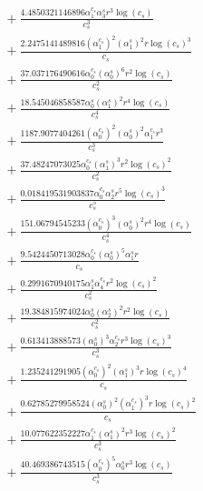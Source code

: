 \documentclass[10pt]{article}
\begin{document}
\begin{align*}
&{}  + \frac{4.4850321146896 \alpha_{1}^{c_s} \alpha_{3}^s r^{3} \log{\left(c_{s} \right)}}{c_{s}^{3}} \\
&{}  + \frac{2.2475141489816 \left(\alpha_{1}^{c_s}\right)^{2} \left(\alpha_{1}^s\right)^{2} r \log{\left(c_{s} \right)}^{3}}{c_{s}} \\
&{}  + \frac{37.037176490616 \alpha_{0}^{c_s} \left(\alpha_{0}^s\right)^{6} r^{2} \log{\left(c_{s} \right)}}{c_{s}^{2}} \\
&{}  + \frac{18.545046858587 \alpha_{0}^s \left(\alpha_{1}^s\right)^{2} r^{4} \log{\left(c_{s} \right)}}{c_{s}^{4}} \\
&{}  + \frac{1187.9077404261 \left(\alpha_{0}^{c_s}\right)^{2} \left(\alpha_{0}^s\right)^{2} \alpha_{1}^{c_s} r^{3}}{c_{s}^{3}} \\
&{}  + \frac{37.48247073025 \alpha_{0}^{c_s} \left(\alpha_{1}^s\right)^{3} r^{2} \log{\left(c_{s} \right)}^{2}}{c_{s}^{2}} \\
&{}  + \frac{0.018419531903837 \alpha_{0}^{c_s} \alpha_{2}^s r^{5} \log{\left(c_{s} \right)}^{3}}{c_{s}^{5}} \\
&{}  + \frac{151.06794545233 \left(\alpha_{0}^{c_s}\right)^{3} \left(\alpha_{0}^s\right)^{2} r^{4} \log{\left(c_{s} \right)}}{c_{s}^{4}} \\
&{}  + \frac{9.5424450713028 \alpha_{0}^{c_s} \left(\alpha_{0}^s\right)^{5} \alpha_{1}^s r}{c_{s}} \\
&{}  + \frac{0.2991670940175 \alpha_{1}^s \alpha_{4}^{c_s} r^{2} \log{\left(c_{s} \right)}^{2}}{c_{s}^{2}} \\
&{}  + \frac{19.384815974024 \alpha_{0}^s \left(\alpha_{2}^s\right)^{2} r^{2} \log{\left(c_{s} \right)}}{c_{s}^{2}} \\
&{}  + \frac{0.613413888573 \left(\alpha_{0}^s\right)^{3} \alpha_{2}^{c_s} r^{3} \log{\left(c_{s} \right)}^{3}}{c_{s}^{3}} \\
&{}  + \frac{1.235241291905 \left(\alpha_{0}^{c_s}\right)^{2} \left(\alpha_{1}^s\right)^{3} r \log{\left(c_{s} \right)}^{4}}{c_{s}} \\
&{}  + \frac{0.62785279958524 \left(\alpha_{0}^s\right)^{2} \left(\alpha_{1}^{c_s}\right)^{3} r \log{\left(c_{s} \right)}^{2}}{c_{s}} \\
&{}  + \frac{10.077622352227 \alpha_{1}^{c_s} \left(\alpha_{1}^s\right)^{2} r^{3} \log{\left(c_{s} \right)}^{2}}{c_{s}^{3}} \\
&{}  + \frac{40.469386743515 \left(\alpha_{0}^{c_s}\right)^{5} \alpha_{0}^s r^{3} \log{\left(c_{s} \right)}}{c_{s}^{3}} \\

\end{align*}
\end{document}
